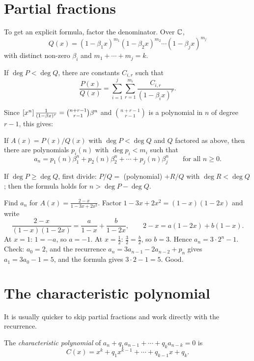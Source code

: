 \section{Partial fractions}

To get an explicit formula, factor the denominator. Over $\mathbb{C}$,
\[
Q(x) = (1 - \beta_1 x)^{m_1}(1 - \beta_2x)^{m_2}\cdots(1-\beta_jx)^{m_j}
\]
with distinct non-zero $\beta_i$ and $m_1 + \cdots + m_j = k$.

\begin{theorem}
If $\deg P < \deg Q$, there are constants $C_{i,r}$ such that
\[
\frac{P(x)}{Q(x)} = \sum_{i=1}^{j}\sum_{r=1}^{m_i}\frac{C_{i,r}}{(1-\beta_ix)^r}.
\]
\end{theorem}

Since $\left[x^{n}\right]\frac{1}{(1-\beta x)^r} = \binom{n+r-1}{r-1}\beta^n$ and
$\binom{n+r-1}{r-1}$ is a polynomial in $n$ of degree $r-1$, this gives:

\begin{theorem}
If $A(x) = P(x)/Q(x)$ with $\deg P < \deg Q$ and $Q$ factored as above, then there are polynomials
$p_i(n)$ with $\deg p_i < m_i$ such that
\[
a_n = p_1(n)\beta_1^n + p_2(n)\beta_2^n + \cdots + p_j(n)\beta_j^n \qquad\text{for all } n\ge0.
\]
\end{theorem}

If $\deg P \ge \deg Q$, first divide: $P/Q = $ (polynomial) $+ R/Q$ with $\deg R < \deg Q$; then the
formula holds for $n > \deg P - \deg Q$.

\begin{example}
Find $a_n$ for $A(x) = \frac{2-x}{1-3x+2x^2}$. Factor $1 - 3x + 2x^2 = (1-x)(1-2x)$ and write
\[
\frac{2-x}{(1-x)(1-2x)} = \frac{a}{1-x} + \frac{b}{1-2x},\qquad 2-x = a(1-2x) + b(1-x).
\]
At $x = 1$: $1 = -a$, so $a = -1$. At $x = \frac12$: $\frac32 = \frac{b}{2}$, so $b = 3$. Hence
$a_n = 3\cdot2^n - 1$. Check: $a_0 = 2$, and the recurrence $a_n = 3a_{n-1} - 2a_{n-2} + p_n$
gives $a_1 = 3a_0 - 1 = 5$, and the formula gives $3\cdot 2 - 1 = 5$. Good.
\end{example}

\section{The characteristic polynomial}

It is usually quicker to skip partial fractions and work directly with the recurrence.

\begin{definition}
The \emph{characteristic polynomial} of $a_n + q_1a_{n-1} + \cdots + q_ka_{n-k} = 0$ is
\[
C(x) = x^k + q_1x^{k-1} + \cdots + q_{k-1}x + q_k.
\]
\end{definition}

